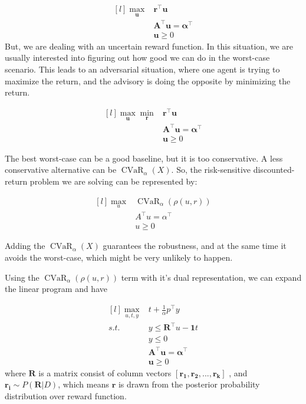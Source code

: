 \documentclass{article}
\theoremstyle{remark}
\theoremstyle{remark}
\theoremstyle{remark}
\theoremstyle{remark}
\theoremstyle{remark}
\theoremstyle{remark}
\newcommand{\cvalatrisk}[2]{\operatorname{CVaR}_{#1}(#2)}
\begin{document}
\[
\begin{matrix*}[l]
\max_\mathbf{u} & \mathbf{r}^\top \mathbf{u} \\
   & \mathbf{A}^\top \mathbf{u} = \mathbf{\alpha}^\top \\
   & \mathbf{u} \geq 0
\end{matrix*} 
\]
But, we are dealing with an uncertain reward function. In this situation, we are usually interested into figuring out how good we can do in the worst-case scenario. This leads to an adversarial situation, where one agent is trying to maximize the return, and the advisory is doing the opposite by minimizing the return.

\[
\begin{matrix*}[l]
\max_\mathbf{u} \min_\mathbf{r} & \mathbf{r}^\top \mathbf{u} \\
   & \mathbf{A}^\top \mathbf{u} = \mathbf{\alpha}^\top \\
   & \mathbf{u} \geq 0
\end{matrix*} 
\]
  



The best worst-case can be a good baseline, but it is too conservative. A less conservative alternative can be $\cvalatrisk{\alpha}{X}$. So, the risk-sensitive discounted-return problem we are solving can be represented by\cite{Chow2015}:



\[
\begin{matrix*}[l]
\max_u & \cvalatrisk{\alpha}{\rho(u, r)} \\
   & A^\top u = \alpha^\top \\
   & u \geq 0
\end{matrix*} 
\]

Adding the $\cvalatrisk{\alpha}{X}$ guarantees the robustness, and at the same time it avoids the worst-case, which might be very unlikely to happen.

Using the $\cvalatrisk{\alpha}{\rho(u, r)}$ term with it's dual representation, we can expand the linear program and have

\[
\begin{matrix*}[l]
  \max\limits_{u,t,y} & t+ \frac{1}{\alpha} p^\top y \\
   s.t. & y \leq \mathbf{R}^\top u - \mathbf{1}t  \\
   & y \leq 0 \\
   & \mathbf{A}^\top \mathbf{u} = \mathbf{\alpha}^\top \\
   & \mathbf{u} \geq 0
\end{matrix*}
\]
where $\mathbf{R}$ is a matrix consist of column vectors $[\mathbf{r_1, r_2,..., r_k}]$ , and $\mathbf{r_i} \sim P(\mathbf{R}|D)$, which means $\mathbf{r}$ is drawn from the posterior probability distribution over reward function.
\end{document}
